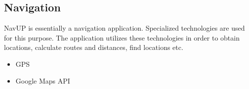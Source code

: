 \documentclass{article}
\begin{document}
	\subsection{Navigation}
NavUP is essentially a navigation application.  Specialized technologies are used for this purpose.  The application utilizes these technologies in order to obtain locations, calculate routes and distances, find locations etc.  
		\begin{itemize}
			\item GPS
			\item Google Maps API
		\end{itemize}
\end{document}
